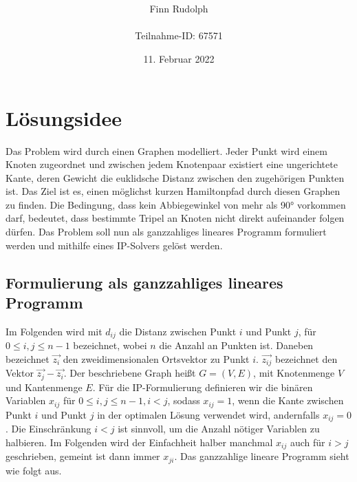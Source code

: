 \documentclass[a4paper, 10pt, ngerman]{article}
\title{\LARGE \textbf{\Aufgabe}}
\author{\large Finn Rudolph \\ \\ \large Teilnahme-ID: 67571}
\date{\large 11. Februar 2022}
\begin{document}
\begin{titlepage}
    \maketitle
    \tableofcontents
    \thispagestyle{empty}
\end{titlepage}

\newtheorem{theorem}{Satz}
\newtheorem{lemma}{Lemma}
\theoremstyle{definition}
\newtheorem{definition}{Definition}

\section{Lösungsidee}

Das Problem wird durch einen Graphen modelliert. Jeder Punkt wird einem Knoten zugeordnet und zwischen jedem Knotenpaar existiert eine ungerichtete Kante, deren Gewicht die euklidsche Distanz zwischen den zugehörigen Punkten ist. Das Ziel ist es, einen möglichst kurzen Hamiltonpfad durch diesen Graphen zu finden. Die Bedingung, dass kein Abbiegewinkel von mehr als 90° vorkommen darf, bedeutet, dass bestimmte Tripel an Knoten nicht direkt aufeinander folgen dürfen. Das Problem soll nun als ganzzahliges lineares Programm formuliert werden und mithilfe eines IP-Solvers gelöst werden.

\subsection{Formulierung als ganzzahliges lineares Programm}

Im Folgenden wird mit $d_{ij}$ die Distanz zwischen Punkt $i$ und Punkt $j$, für $0 \le i, j \le n - 1$ bezeichnet, wobei $n$ die Anzahl an Punkten ist. Daneben bezeichnet $\vec{z_i}$ den zweidimensionalen Ortsvektor zu Punkt $i$. $\vec{z_{ij}}$ bezeichnet den Vektor $\vec{z_j} - \vec{z_i}$. Der beschriebene Graph heißt $G = (V, E)$, mit Knotenmenge $V$ und Kantenmenge $E$. Für die IP-Formulierung definieren wir die binären Variablen $x_{ij}$ für $0 \le i, j \le n - 1, i < j$, sodass $x_{ij} = 1$, wenn die Kante zwischen Punkt $i$ und Punkt $j$ in der optimalen Lösung verwendet wird, andernfalls $x_{ij} = 0$. Die Einschränkung $i < j$ ist sinnvoll, um die Anzahl nötiger Variablen zu halbieren. Im Folgenden wird der Einfachheit halber manchmal $x_{ij}$ auch für $i > j$ geschrieben, gemeint ist dann immer $x_{ji}$. Das ganzzahlige lineare Programm sieht wie folgt aus.
\end{document}
